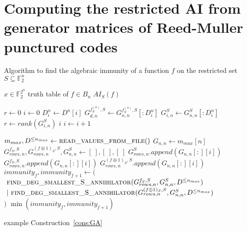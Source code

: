\documentclass[11pt]{llncs}
\begin{document}
\section{Computing the restricted AI from generator matrices of Reed-Muller punctured codes}\label{sec:RMapproach}

\begin{algorithm}
	\caption{Algorithm to find the algebraic immunity of a function $f$ on the restricted set $S\subseteq \mathbb{F}_2^n$}
	\begin{algorithmic}[1]
		\Require $x\in \mathbb{F}_2^{2^n}$ truth table of $f\in B_n$
		\Ensure $AI_S(f)$
		
		\State $r \gets 0$
		\State $i \gets 0$
		\State $D_i^n \gets D^n[i]$
		\State $G_{d,n}^{f_S^{(o)},S}\gets G_{n,n}^{f_S^{(o)},S}[:D_i^n]$
		\State $G_{i,n}^S \gets G_{n,n}^S[:D_i^n]$
		\State $r \gets rank\left(G_{i,n}^S\right)$
		\State
		\Return $i$
		\EndIf
		\State $i \gets i+1$
		\EndWhile
		\EndFunction
		\State
		
		\State $m_{max}, D^{\leq n_{max}}\gets \mbox{\textsc{read\_values\_from\_file}}()$
		\State $G_{n,n}\gets m_{max}[n]$
		\State $G_{rows,n}^{f_S,S}, G_{rows,n}^{(f\oplus 1)_S,S}, G_{n,n}^S \gets [\ ], [\ ], [\ ]$
		\State $G_{rows,n}^{S}.append\left(G_{n,n}[:][i]\right)$
		\State $G_{rows,n}^{f_S,S}.append\left(G_{n,n}[:][i]\right)$
		\Else
		\State $G_{rows,n}^{(f\oplus 1)_S,S}.append\left(G_{n,n}[:][i]\right)$
		\EndIf
		\EndIf
		\EndFor
		\State $immunity_f, immunity_{f+1} \leftarrow ($\\
		$\ \mbox{\textsc{find\_deg\_smallest\_S\_annihilator}}(G_{rows,n}^{f_S,S}, G_{n,n}^S,D^{\leq n_{max}})$\\
		$\ |\ \mbox{\textsc{find\_deg\_smallest\_S\_annihilator}}(G_{rows,n}^{(f\oplus 1)_S,S}, G_{n,n}^S, D^{\leq n_{max}})$\\
		$)$
		\State {}
		\State \Return $\min(immunity_f, immunity_{f+1})$
	\end{algorithmic}
\end{algorithm}
example Construction~\ref{cons:GA}
\end{document}
